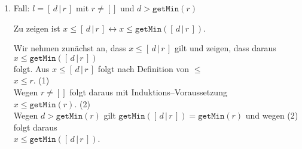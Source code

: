 \documentclass{article}
\begin{document}
\begin{enumerate}
      Wir nehmen nun an, dass  $x \leq \mathtt{getMin}([\,d\,|\,r\,])$ gilt und zeigen,
      dass daraus \\[0.1cm]
      \hspace*{1.3cm}  $x \leq [\,d\,|\,r\,]$ \\[0.1cm]
      folgt.  Aus $\mathtt{getMin}([\,d\,|\,r\,]) = d$ und der Annahme
        $x \leq \mathtt{getMin}([\,d\,|\,r\,])$ folgt \\[0.1cm]
       \hspace*{1.3cm} $x \leq d$. \hspace*{\fill} (2) \\[0.1cm]
      Aus $x\leq d$ und $d \leq \mathtt{getMin}(r)$  folgt       \\[0.1cm] 
      \hspace*{1.3cm} $x \leq \mathtt{getMin}(r)$. \hspace*{\fill} (3) \\[0.1cm]
      Aus $(3)$ folgt mit der Induktions--Voraussetzung dann \\[0.1cm]
      \hspace*{1.3cm} $x \leq r$. \hspace*{\fill} (4) \\[0.1cm]
      Aus (2) und (4) folgt nun \\[0.1cm]
      \hspace*{1.3cm} $x \leq [\,d\,|\,r\,]$.

\item Fall: $l = [\,d\,|\,r\,]$ mit $r \not = []$ und $d > \mathtt{getMin}(r)$

      Zu zeigen ist $x \leq [\,d\,|\,r\,] \leftrightarrow x \leq \mathtt{getMin}([\,d\,|\,r\,])$.

      Wir nehmen zun\"achst an, dass $x \leq [\,d\,|\,r\,]$ gilt und zeigen, dass daraus \\[0.1cm]
      \hspace*{1.3cm} $x \leq \mathtt{getMin}([\,d\,|\,r\,])$ \\[0.1cm]
      folgt.  Aus $x \leq [\,d\,|\,r\,]$ folgt nach Definition von $\leq$ \\[0.1cm]
      \hspace*{1.3cm} $x \leq r$.   \hspace*{\fill} (1) \\[0.1cm]
      Wegen $r\not=[]$ folgt daraus mit Induktions--Voraussetzung \\[0.1cm]
      \hspace*{1.3cm} $x \leq \mathtt{getMin}(r)$. \hspace*{\fill} (2) \\[0.1cm]
      Wegen $d > \mathtt{getMin}(r)$ gilt $\mathtt{getMin}([\,d\,|\,r\,]) = \mathtt{getMin}(r)$ und wegen (2)
      folgt daraus \\[0.1cm]
      \hspace*{1.3cm} $x \leq \mathtt{getMin}([\,d\,|\,r\,])$.
     

\end{enumerate}
\end{document}
